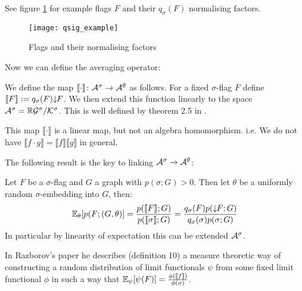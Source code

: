 See figure \ref{fig:qsig_example} for example flags $F$ and their $q_\sigma(F)$
normalising factors.

\begin{figure}[ht]
    \centering
    \texttt{[image: qsig\_example]}
    \caption{Flags and their normalising factors}
    \label{fig:qsig_example}
\end{figure}

Now we can define the averaging operator:

\begin{definition}
    \label{def:classic_averaging}
    We define the map $\llbracket \cdot \rrbracket\colon \mathcal{A}^\sigma \to \mathcal{A}^\emptyset$
    as follows. For a fixed $\sigma$-flag $F$ define
    $\llbracket F \rrbracket := q_\sigma(F) {\downarrow\!\!F}$.
    We then extend this function linearly to the space
    $\mathcal{A}^\sigma = \mathbb{R}\mathcal{G}^\sigma / \mathcal{K}^\sigma$. This is well defined by
    theorem 2.5 in \cite{razborovFlagAlgebras2007}.
\end{definition}

\begin{note}
    This map $\llbracket \cdot \rrbracket$ is a linear map, but not an algebra homomorphism.
    i.e. We do not have
    $\llbracket f\cdot g \rrbracket = \llbracket f \rrbracket \llbracket g \rrbracket$
    in general.
\end{note}

The following result is the key to linking $\mathcal{A}^\sigma \to \mathcal{A}^\emptyset$:
\begin{lemma}
    \label{lemma:classic_exp_flags}
    Let $F$ be a $\sigma$-flag and $G$ a graph with $p(\sigma; G) > 0.$ Then let
    $\theta$ be a uniformly random $\sigma$-embedding into $G$, then:
    \[
        \mathbb{E}_\theta[p(F; (G, \theta)]
        = \frac{p(\llbracket F \rrbracket; G)}{p(\llbracket \sigma \rrbracket; G)}
        = \frac{q_\sigma(F)p({\downarrow\!\!F}; G)}{q_\sigma(\sigma)p(\sigma; G)}
    \]
    In particular by linearity of expectation this can be extended
    $\mathcal{A}^\sigma$.
\end{lemma}

\begin{note}
    In Razborov's paper he describes (definition 10) a measure theoretic way of constructing
    a random distribution of limit functionals $\psi$ from some fixed limit functional
    $\phi$ in such a way that
    $\mathbb{E}_\psi[\psi(F)] = \frac{\phi(\llbracket f \rrbracket)}{\phi(\sigma)}$.
\end{note}


